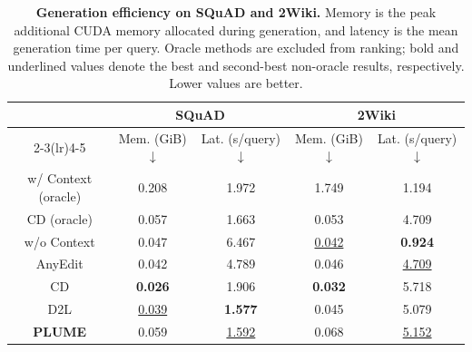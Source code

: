 \begin{table}[!t]
\centering
\small
\setlength{\tabcolsep}{5pt}
\renewcommand{\arraystretch}{1.15}
\providecommand{\MethodHeaderVShift}{-0.3ex}
\begin{tabular}{ccccc}
\toprule
\multirow{2}{*}{\raisebox{\MethodHeaderVShift}{\textbf{Method}}}
& \multicolumn{2}{c}{SQuAD}
& \multicolumn{2}{c}{2Wiki} \\
\cmidrule(lr){2-3}\cmidrule(lr){4-5}
& Mem. (GiB) $\downarrow$
& Lat. (s/query) $\downarrow$
& Mem. (GiB) $\downarrow$
& Lat. (s/query) $\downarrow$ \\
\midrule
w/ Context (oracle)  & 0.208 & 1.972 & 1.749 & 1.194 \\
CD (oracle)          & 0.057 & 1.663 & 0.053 & 4.709 \\
\midrule
w/o Context      & 0.047 & 6.467 & \underline{0.042} & \textbf{0.924} \\
AnyEdit          & 0.042 & 4.789 & 0.046 & \underline{4.709} \\
CD               & \textbf{0.026} & 1.906 & \textbf{0.032} & 5.718 \\
D2L              & \underline{0.039} & \textbf{1.577} & 0.045 & 5.079 \\
\midrule
\textbf{PLUME}   & 0.059 & \underline{1.592} & 0.068 & \underline{5.152} \\
\bottomrule
\end{tabular}
\caption{
\textbf{Generation efficiency on SQuAD and 2Wiki.}
Memory is the peak additional CUDA memory allocated during generation, and
latency is the mean generation time per query. Oracle methods are excluded
from ranking; bold and underlined values denote the best and second-best
non-oracle results, respectively. Lower values are better.
}
\label{tab:generation-efficiency}
\end{table}

